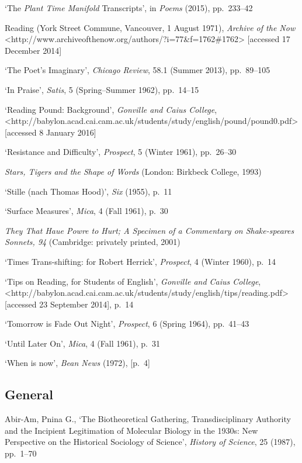 \documentclass[]{article}
\begin{document}
‘The \emph{Plant Time Manifold} Transcripts’, in \emph{Poems} (2015),
pp.~233–42

Reading (York Street Commune, Vancouver, 1 August 1971), \emph{Archive
of the Now}\\
\textless{}http://www.archiveofthenow.org/authors/?i=77\&f=1762\#1762\textgreater{}
{[}accessed 17 December 2014{]}

‘The Poet’s Imaginary’, \emph{Chicago Review}, 58.1 (Summer 2013),
pp.~89–105

‘In Praise’, \emph{Satis}, 5 (Spring–Summer 1962), pp.~14–15

‘Reading Pound: Background’, \emph{Gonville and Caius College},\\
\textless{}http://babylon.acad.cai.cam.ac.uk/students/study/english/pound/pound0.pdf\textgreater{}
{[}accessed 8 January 2016{]}

‘Resistance and Difficulty’, \emph{Prospect}, 5 (Winter 1961), pp.~26–30

\emph{Stars, Tigers and the Shape of Words} (London: Birkbeck College,
1993)

‘Stille (nach Thomas Hood)’, \emph{Six} (1955), p.~11

‘Surface Measures’, \emph{Mica}, 4 (Fall 1961), p.~30

\emph{They That Haue Powre to Hurt; A Specimen of a Commentary on
Shake-speares Sonnets, 94} (Cambridge: privately printed, 2001)

‘Times Trans-shifting: for Robert Herrick’, \emph{Prospect}, 4 (Winter
1960), p.~14

‘Tips on Reading, for Students of English’, \emph{Gonville and Caius
College},\\
\textless{}http://babylon.acad.cai.cam.ac.uk/students/study/english/tips/reading.pdf\textgreater{}
{[}accessed 23 September 2014{]}, p.~14

‘Tomorrow is Fade Out Night’, \emph{Prospect}, 6 (Spring 1964),
pp.~41–43

‘Until Later On’, \emph{Mica}, 4 (Fall 1961), p.~31

‘When is now’, \emph{Bean News} (1972), {[}p.~4{]}

\subsection{General}\label{general}

Abir-Am, Pnina G., ‘The Biotheoretical Gathering, Transdisciplinary
Authority and the Incipient Legitimation of Molecular Biology in the
1930s: New Perspective on the Historical Sociology of Science’,
\emph{History of Science}, 25 (1987), pp.~1–70
\end{document}

